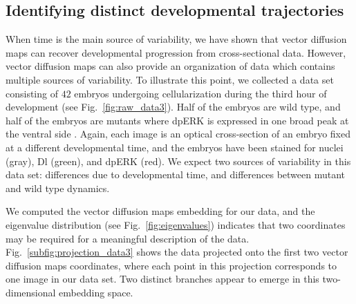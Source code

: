 \documentclass{pnastwo}
\newcommand{\fig}[0]{Fig.}
\begin{document}
\begin{article}
\subsection{Identifying distinct developmental trajectories}

When time is the main source of variability, we have shown that vector diffusion maps can recover developmental progression from cross-sectional data.
%
However, vector diffusion maps can also provide an organization of data which contains multiple sources of variability.
%
To illustrate this point, we collected a data set consisting of $42$ embryos undergoing cellularization during the third hour of development (see \fig~\ref{fig:raw_data3}).
%
Half of the embryos are wild type, and half of the embryos are mutants where dpERK is expressed in one broad peak at the ventral side \cite{snail}.
%
Again, each image is an optical cross-section of an embryo fixed at a different developmental time, and the embryos have been stained for nuclei (gray), Dl (green), and dpERK (red).
%
We expect two sources of variability in this data set: differences due to developmental time, and differences between mutant and wild type dynamics.


We computed the vector diffusion maps embedding for our data, and the eigenvalue distribution (see \fig~\ref{fig:eigenvalues}) indicates that two coordinates may be required for a meaningful description of the data. 
%
\fig~\ref{subfig:projection_data3} shows the data projected onto the first two vector diffusion maps coordinates, where each point in this projection corresponds to one image in our data set.
%
Two distinct branches appear to emerge in this two-dimensional embedding space.



\end{article}
\end{document}
